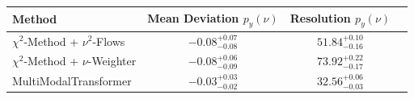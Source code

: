     \begin{tabular}{lccc}
        \toprule
        Method & Mean Deviation $p_{y}(\nu)$ & Resolution $p_{y}(\nu)$ \\
        \midrule
        $\chi^2$-Method + $\nu^2$-Flows & $-0.08^{+0.07}_{-0.08}$ & $51.84^{+0.10}_{-0.16}$ \\
        $\chi^2$-Method + $\nu$-Weighter & $-0.08^{+0.06}_{-0.09}$ & $73.92^{+0.22}_{-0.17}$ \\
        MultiModalTransformer & $-0.03^{+0.03}_{-0.02}$ & $32.56^{+0.06}_{-0.03}$ \\
        \bottomrule
    \end{tabular}
